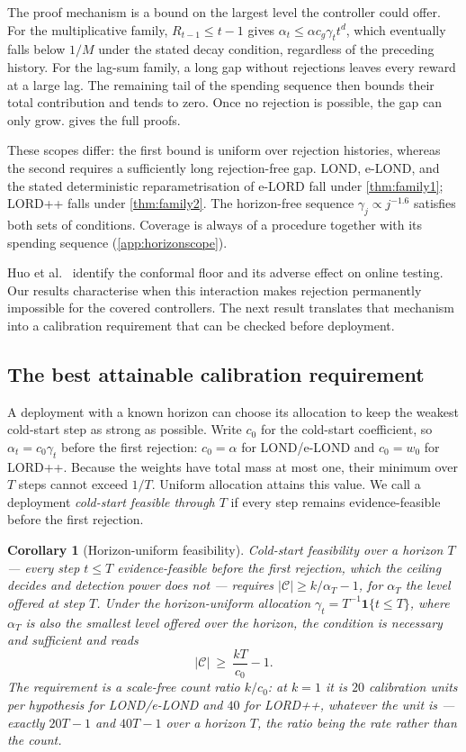 \documentclass[conference]{IEEEtran}
\newtheorem{corollary}{Corollary}
\newcommand{\Cal}{\mathcal{C}}
\newcommand{\nCal}{\lvert\Cal\rvert}
\newcommand{\ceil}{M}
\newcommand{\alphat}{\alpha_t}
\begin{document}
The proof mechanism is a bound on the largest level the controller could offer. For the
multiplicative family, $R_{t-1}\le t-1$ gives
$\alphat\le\alpha c_g\gamma_t t^d$, which eventually falls below $1/\ceil$ under the stated decay
condition, regardless of the preceding history. For the lag-sum family, a long gap without
rejections leaves every reward at a large lag. The remaining tail of the spending sequence then
bounds their total contribution and tends to zero. Once no rejection is possible, the gap can only
grow.  gives the full proofs.

These scopes differ: the first bound is uniform over rejection histories, whereas the second
requires a sufficiently long rejection-free gap. LOND, e-LOND, and the stated deterministic
reparametrisation of e-LORD fall under \cref{thm:family1}; LORD++ falls under
\cref{thm:family2}. The horizon-free sequence $\gamma_j\propto j^{-1.6}$ satisfies both sets of
conditions. Coverage is always of a procedure together with its spending sequence
(\cref{app:horizonscope}).

Huo et al.~\cite{huo2024realtime} identify the conformal floor and its adverse effect on online
testing. Our results characterise when this interaction makes rejection permanently impossible for
the covered controllers. The next result translates that mechanism into a calibration requirement
that can be checked before deployment.

\subsection{The best attainable calibration requirement}\label{sec:exchange}

A deployment with a known horizon can choose its allocation to keep the weakest cold-start step as
strong as possible. Write $c_0$ for the cold-start coefficient, so $\alphat=c_0\gamma_t$ before the
first rejection: $c_0=\alpha$ for LOND/e-LOND and $c_0=w_0$ for LORD++. Because the weights have total
mass at most one, their minimum over $T$ steps cannot exceed $1/T$. Uniform allocation attains
this value. We call a deployment \emph{cold-start feasible through $T$} if every step remains
evidence-feasible before the first rejection.

\begin{corollary}[Horizon-uniform feasibility]\label{cor:budget}
Cold-start feasibility over a horizon $T$ --- every step $t\le T$ evidence-feasible before the first
rejection, which the ceiling decides and detection power does not --- requires $\nCal\ge k/\alpha_T-1$,
for $\alpha_T$ the level offered at step $T$. Under the horizon-uniform allocation
$\gamma_t=T^{-1}\mathbf 1\{t\le T\}$, where $\alpha_T$ is also the smallest level offered over the
horizon, the condition is necessary \emph{and} sufficient and reads
\[
\nCal\ \ge\ \frac{kT}{c_0}-1 .
\]
The requirement is a scale-free count ratio $k/c_0$: at $k=1$ it is $20$ calibration units per
hypothesis for LOND/e-LOND and $40$ for LORD++, whatever the unit is --- exactly $20T-1$ and $40T-1$
over a horizon $T$, the ratio being the rate rather than the count.
\end{corollary}
\end{document}
